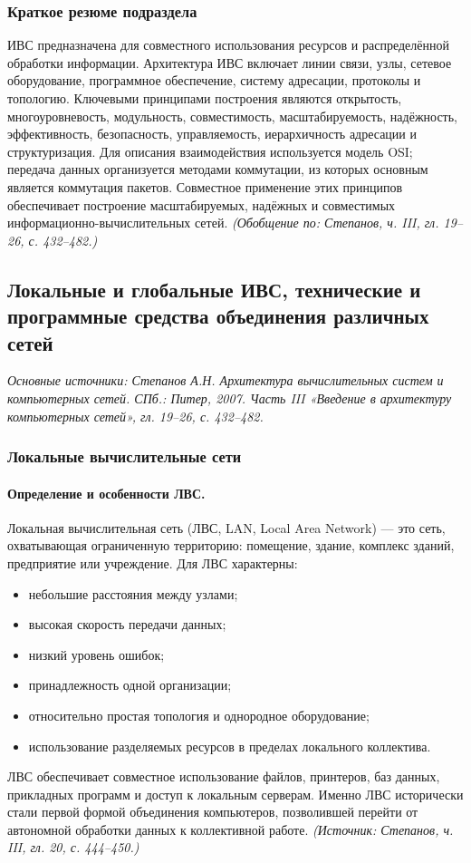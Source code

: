 \documentclass[a4paper,12pt]{article}
\begin{document}
\subsubsection{Краткое резюме подраздела}
ИВС предназначена для совместного использования ресурсов и распределённой обработки информации. Архитектура ИВС включает линии связи, узлы, сетевое оборудование, программное обеспечение, систему адресации, протоколы и топологию. Ключевыми принципами построения являются открытость, многоуровневость, модульность, совместимость, масштабируемость, надёжность, эффективность, безопасность, управляемость, иерархичность адресации и структуризация. Для описания взаимодействия используется модель OSI; передача данных организуется методами коммутации, из которых основным является коммутация пакетов. Совместное применение этих принципов обеспечивает построение масштабируемых, надёжных и совместимых информационно-вычислительных сетей.
\textit{(Обобщение по: Степанов, ч. III, гл. 19–26, с. 432–482.)}

\subsection{Локальные и глобальные ИВС, технические и программные средства объединения различных сетей}

\noindent\textit{Основные источники: Степанов А.Н. Архитектура вычислительных систем и компьютерных сетей. СПб.: Питер, 2007. Часть III «Введение в архитектуру компьютерных сетей», гл. 19–26, с. 432–482.}

\subsubsection{Локальные вычислительные сети}

\paragraph{Определение и особенности ЛВС.}
Локальная вычислительная сеть (ЛВС, LAN, Local Area Network) — это сеть, охватывающая ограниченную территорию: помещение, здание, комплекс зданий, предприятие или учреждение. Для ЛВС характерны:
\begin{itemize}
\item небольшие расстояния между узлами;
\item высокая скорость передачи данных;
\item низкий уровень ошибок;
\item принадлежность одной организации;
\item относительно простая топология и однородное оборудование;
\item использование разделяемых ресурсов в пределах локального коллектива.
\end{itemize}
ЛВС обеспечивает совместное использование файлов, принтеров, баз данных, прикладных программ и доступ к локальным серверам. Именно ЛВС исторически стали первой формой объединения компьютеров, позволившей перейти от автономной обработки данных к коллективной работе.
\textit{(Источник: Степанов, ч. III, гл. 20, с. 444–450.)}
\end{document}
